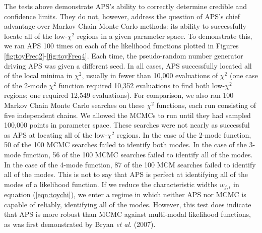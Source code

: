 \documentclass[useAMS,usenatbib]{aastex}
\begin{document}
The tests above demonstrate APS's ability to correctly determine credible and
confidence limits.  They do not, however, address the question of APS's chief
advantage over Markov Chain Monte Carlo methods: its ability to successfully
locate all of the low-$\chi^2$ regions in a given parameter space.  To
demonstrate this, we ran APS 100 times on each of the likelihood functions
plotted in Figures \ref{fig:toyFreq2}-\ref{fig:toyFreq4}.  Each time, the
pseudo-random number generator driving APS was given a different seed.  In all
cases, APS successfully located all of the local minima in $\chi^2$, usually in
fewer than 10,000 evaluations of $\chi^2$ (one case of the 2-mode $\chi^2$
function required 10,352 evaluations to find both low-$\chi^2$ regions; one
required 12,549 evaluations).  For comparison, we also ran 100 Markov Chain
Monte Carlo searches on these $\chi^2$ functions, each run consisting of five
independent chains.  We allowed the MCMCs to run
until they had sampled 100,000 points in parameter space.  
These searches were not nearly as successful as APS at
locating all of the low-$\chi^2$ regions.  In the case of the 2-mode function,
50 of the 100 MCMC searches failed to identify both modes.  In the case of the
3-mode function, 56 of the 100 MCMC searches failed to identify all of the
modes.  In the case of the 4-mode function, 87 of the 100 MCM searches failed to
identify all of the modes.  This is not to say that APS is perfect at
identifying all of the modes of a likelihood function.  If we reduce the
characteristic widths $w_{j,i}$ in equation (\ref{eqn:toychi}), we enter a regime
in which neither APS nor MCMC is capable of reliably,
identifying all of the modes.  However, this test does indicate that APS is more
robust than MCMC against multi-modal likelihood functions, as was first
demonstrated by Bryan {\it et al}. (2007).
\end{document}
